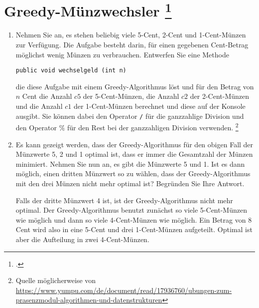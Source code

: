 \documentclass{bschlangaul-aufgabe}
\begin{document}

\section{Greedy-Münzwechsler
\footcite[Seite 1, reedy-Münzwechsler, Aufgabe 1]{aud:ab:3}}

\begin{enumerate}


\item Nehmen Sie an, es stehen beliebig viele 5-Cent, 2-Cent und
1-Cent-Münzen zur Verfügung. Die Aufgabe besteht darin, für einen
gegebenen Cent-Betrag möglichst wenig Münzen zu verbrauchen. Entwerfen
Sie eine Methode

\begin{verbatim}
public void wechselgeld (int n)
\end{verbatim}

die diese Aufgabe mit einem Greedy-Algorithmus löst und für den Betrag
von $n$ Cent die Anzahl $c5$ der 5-Cent-Münzen, die Anzahl $c2$ der
2-Cent-Münzen und die Anzahl $c1$ der 1-Cent-Münzen berechnet und diese
auf der Konsole ausgibt. Sie können dabei den Operator \texttt{/} für
die ganzzahlige Division und den Operator $\%$ für den Rest bei der
ganzzahligen Division verwenden.
\footnote{Quelle möglicherweise von \url{https://www.yumpu.com/de/document/read/17936760/ubungen-zum-prasenzmodul-algorithmen-und-datenstrukturen}}

\begin{bAntwort}
\end{bAntwort}


\item Es kann gezeigt werden, dass der Greedy-Algorithmus für den obigen
Fall der Münzwerte 5, 2 und 1 optimal ist, \dh dass er immer die
Gesamtzahl der Münzen minimiert. Nehmen Sie nun an, es gibt die
Münzwerte 5 und 1. Ist es dann möglich, einen dritten Münzwert so zu
wählen, dass der Greedy-Algorithmus mit den drei Münzen nicht mehr
optimal ist? Begründen Sie Ihre Antwort.

\begin{bAntwort}
Falls der dritte Münzwert 4 ist, ist der Greedy-Algorithmus nicht mehr
optimal. Der Greedy-Algorithmus benutzt zunächst so viele 5-Cent-Münzen
wie möglich und dann so viele 4-Cent-Münzen wie möglich. Ein Betrag von
8 Cent wird also in eine 5-Cent und drei 1-Cent-Münzen aufgeteilt.
Optimal ist aber die Aufteilung in zwei 4-Cent-Münzen.
\end{bAntwort}
\end{enumerate}

\begin{bAdditum}
\end{bAdditum}
\end{document}

